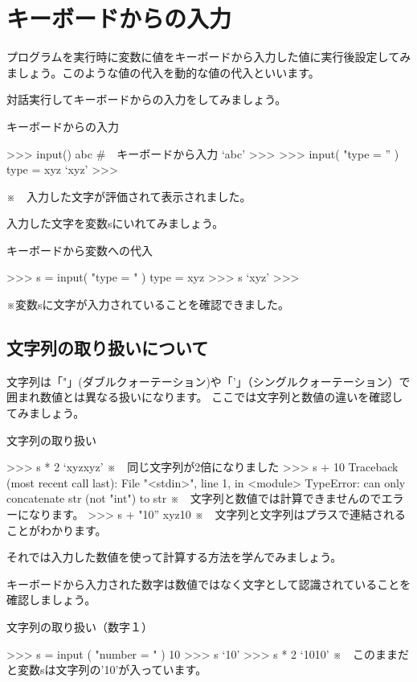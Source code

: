 \documentclass[11pt,a4paper,dvipdfmx,titlepage]{jsreport}
\begin{document}
\section{キーボードからの入力}
プログラムを実行時に変数に値をキーボードから入力した値に実行後設定してみましょう。このような値の代入を動的な値の代入といいます。

 {\gt 対話実行}してキーボードからの入力をしてみましょう。
\begin{grabox}{キーボードからの入力}
\begin{listing}{1}
>>> input()
abc #　キーボードから入力
‘abc’
>>>
>>> input( "type = ” )
type = xyz
‘xyz’
>>>
\end{listing}
\end{grabox}

※　入力した文字が評価されて表示されました。

入力した文字を変数sにいれてみましょう。
\begin{grabox}{キーボードから変数への代入}
\begin{listingcont}
>>> s = input( "type = " )
type = xyz
>>> s
‘xyz’
>>>
\end{listingcont}
\end{grabox}
※変数sに文字が入力されていることを確認できました。

\subsection{文字列の取り扱いについて}

文字列は「"」(ダブルクォーテーション)や「'」（シングルクォーテーション）で囲まれ数値とは異なる扱いになります。
ここでは文字列と数値の違いを確認してみましょう。
\begin{grabox}{文字列の取り扱い}
\begin{listingcont}
>>> s * 2
‘xyzxyz’
※　同じ文字列が2倍になりました
>>> s + 10
Traceback (most recent call last):
  File "<stdin>", line 1, in <module>
TypeError: can only concatenate str (not "int") to str
※　文字列と数値では計算できませんのでエラーになります。
>>> s + "10”
xyz10
※　文字列と文字列はプラスで連結されることがわかります。
\end{listingcont}
\end{grabox}

それでは入力した数値を使って計算する方法を学んでみましょう。

キーボードから入力された数字は数値ではなく文字として認識されていることを確認しましょう。

\begin{grabox}{文字列の取り扱い（数字１）}
\begin{listingcont}
>>> s = input ( "number = " )
10
>>> s
‘10’
>>> s * 2
‘1010’
※　このままだと変数sは文字列の’10’が入っています。
\end{listingcont}
\end{grabox}
\end{document}
